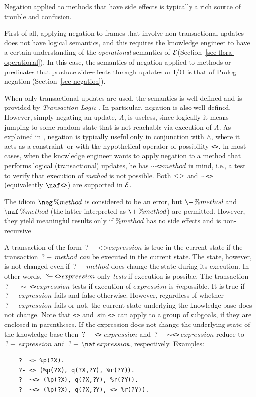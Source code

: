 \documentclass[11pt]{article}
\newcommand{\ERGO}{\mbox{\ensuremath{\cal{E}}\smaller{{\sc{RGO}}}}\xspace}
\newcommand{\FLSYSTEM}{\ERGO}
\newcommand{\query}{\mbox{$\, ?\! - \, $}}                  %
\newcommand{\bs}{\textbackslash}
\newcommand{\PLGNAF}{\mbox{\texttt{\bs}+}\xspace}
\newcommand{\RULELOGNAF}{{\texttt{{\bs}naf}}\xspace}
\newcommand{\RULELOGNEG}{{\texttt{{\bs}neg}}\xspace}
\begin{document}
Negation applied to methods that have side effects is typically a rich source
of trouble and confusion.

First of all, applying negation to frames that involve
non-transactional updates does not have logical semantics, and this
requires the
knowledge engineer to have a certain understanding of the \emph{operational} semantics of
\FLSYSTEM (Section~\ref{sec-flora-operational}).
In this case, the semantics of negation applied to methods or predicates that produce
side-effects through updates  or I/O is that of Prolog negation
(Section~\ref{sec-negation}).

When only transactional updates are used, the semantics is well defined and
is provided by \emph{Transaction Logic}
\cite{trans-chapter-98,trans-tcs94}. In particular, negation is also well
defined. However, simply negating an update, \emph{A}, is useless,
since logically it means jumping to some random state that is not
reachable via execution of \emph{A}.  As explained in
\cite{trans-chapter-98,trans-tcs94}, negation is typically useful only in conjunction
with $\wedge$, where it acts as a constraint, or with the hypothetical
operator of possibility \texttt{<>}.  In most cases, when the knowledge
engineer
wants to apply negation to a method that performs logical (transactional)
updates, he has \texttt{$\sim$<>}$method$  in mind, i.e., a test to
verify that execution of \emph{method}  is not possible.
Both $\tt<>$ and \texttt{$\sim$<>} (equivalently $\tt\RULELOGNAF \texttt{<>}$) are supported in \FLSYSTEM.

The idiom ${\tt \RULELOGNEG}\,\%method$ is considered to be an error, but
$\PLGNAF\,\%method$ and $\RULELOGNAF\,\%method$ (the latter interpreted as
$\PLGNAF\,\%method$) are permitted. However, they yield meaningful results only
if $\%method$ has no side effects and is non-recursive.

A transaction of the form $\query \texttt{<>} expression$ is true in the current
state if the transaction $\query method$ \emph{can} be executed in the current
state. The state, however, is not changed even if  $\query method$
does change the state during its execution. In other words, $\texttt{\query <>}
expression$ only \emph{tests} if execution is possible.
The transaction \texttt{\query} \texttt{$\sim$ <>}$expression$ tests if execution of
$expression$ is \emph{im}possible. It is true if $\query expression$ fails
and false otherwise. However, regardless of whether $\query expression$
fails or not, the current state underlying the knowledge base does not
change.
Note that \texttt{<>} and \texttt{$\sin$<>} can apply to a group of
subgoals, if they are enclosed in parentheses.  If the expression does not
change the underlying state of the knowledge base then
\texttt{\query <>} $expression$ and \query\texttt{$\sim$<>}\,$expression$ reduce to
$\query expression$ and $\query \RULELOGNAF\,expression$, respectively. 
Examples:
\begin{verbatim}
    ?- <> %p(?X).
    ?- <> (%p(?X), q(?X,?Y), %r(?Y)).
    ?- ~<> (%p(?X), q(?X,?Y), %r(?Y)).
    ?- ~<> (%p(?X), q(?X,?Y), <> %r(?Y)).
\end{verbatim}
\end{document}
